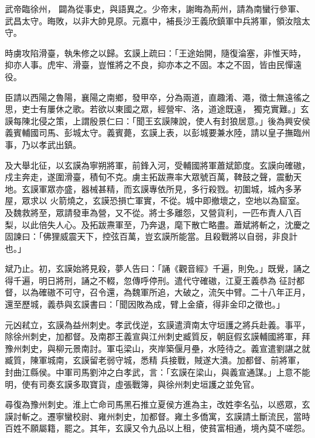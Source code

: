\begin{pinyinscope}
 武帝臨徐州，
 闢為從事史，與語異之。少帝末，謝晦為荊州，請為南蠻行參軍、武昌太守。晦敗，以非大帥見原。元嘉中，補長沙王義欣鎮軍中兵將軍，領汝陰太守。



 時虜攻陷滑臺，執朱修之以歸。玄謨上疏曰：「王途始開，隨復淪塞，非惟天時，抑亦人事。虎牢、滑臺，豈惟將之不良，抑亦本之不固。本之不固，皆由民憚遠役。



 臣請以西陽之魯陽，襄陽之南鄉，發甲卒，分為兩道，直趣淆、澠，徵士無遠徭之思，吏士有屢休之歌。若欲以東國之眾，經營牢、洛，道途既遠，
 獨克實難。」玄謨每陳北侵之策，上謂殷景仁曰：「聞王玄謨陳說，使人有封狼居意。」後為興安侯義賓輔國司馬、彭城太守。義賓薨，玄謨上表，以彭城要兼水陸，請以皇子撫臨州事，乃以孝武出鎮。



 及大舉北征，以玄謨為寧朔將軍，前鋒入河，受輔國將軍蕭斌節度。玄謨向確磝，戍主奔走，遂圍滑臺，積旬不克。虜主拓跋燾率大眾號百萬，鞞鼓之聲，震動天地。玄謨軍眾亦盛，器械甚精，而玄謨專依所見，多行殺戮。初圍城，城內多茅屋，眾求以
 火箭燒之，玄謨恐損亡軍實，不從。城中即撤壞之，空地以為窟室。及魏救將至，眾請發車為營，又不從。將士多離怨，又營貨利，一匹布責人八百梨，以此倍失人心。及拓跋燾軍至，乃奔退，麾下散亡略盡。蕭斌將斬之，沈慶之固諫曰：「佛狸威震天下，控弦百萬，豈玄謨所能當。且殺戰將以自弱，非良計也。」



 斌乃止。初，玄謨始將見殺，夢人告曰：「誦《觀音經》千遍，則免。」既覺，誦之得千遍，明日將刑，誦之不輟，忽傳呼停刑。遣代守確磝，江夏王義恭為
 征討都督，以為確磝不可守，召令還，為魏軍所追，大破之，流矢中臂。二十八年正月，還至歷城，義恭與玄謨書曰：「聞因敗為成，臂上金瘡，得非金印之徵也。」



 元凶弒立，玄謨為益州刺史。孝武伐逆，玄謨遣濟南太守垣護之將兵赴義。事平，除徐州刺史，加都督。及南郡王義宣與江州刺史臧質反，朝庭假玄謨輔國將軍，拜豫州刺史，與柳元景南討。軍屯梁山，夾岸築偃月壘，水陸待之。義宣遣劉諶之就臧質，陳軍城南，玄謨留老弱守城，悉精
 兵接戰，賊遂大潰。加都督、前將軍，封曲江縣侯。中軍司馬劉沖之白孝武，言：「玄謨在梁山，與義宣通謀。」上意不能明，使有司奏玄謨多取寶貨，虛張戰簿，與徐州刺史垣護之並免官。



 尋復為豫州刺史。淮上亡命司馬黑石推立夏侯方進為主，改姓李名弘，以惑眾，玄謨討斬之。遷寧蠻校尉、雍州刺史，加都督。雍土多僑寓，玄謨請土斷流民，當時百姓不願屬籍，罷之。其年，玄謨又令九品以上租，使貧富相通，境內莫不嗟怨。




\end{pinyinscope}
